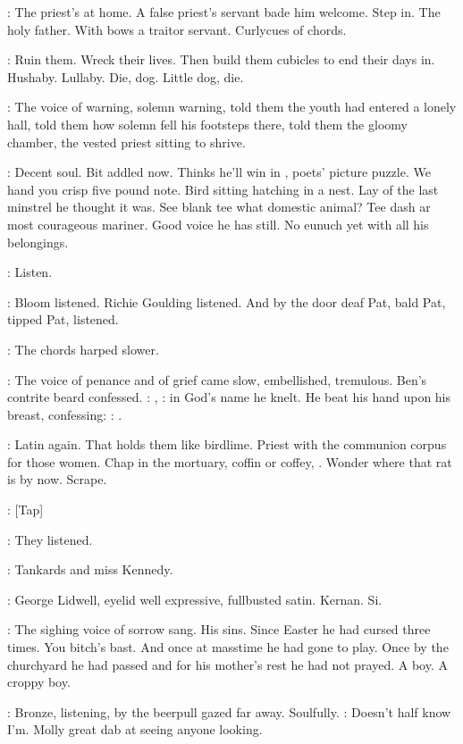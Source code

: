 :
The priest's at home.
A false priest's servant bade him welcome.
Step
in.
The holy father.
With bows a traitor servant.
Curlycues of chords.

\BloomInt:
Ruin them.
Wreck their lives.
Then build them cubicles to end their
days in.
Hushaby.
Lullaby.
Die,
dog.
Little dog,
die.

:
The voice of warning,
solemn warning,
told them the youth had
entered a lonely hall,
told them how solemn fell his footsteps there,
told
them the gloomy chamber,
the vested priest sitting to shrive.

\BloomInt:
Decent soul.
Bit addled now.
Thinks he'll win in
,
poets' picture puzzle.
We hand you crisp five pound note.
Bird sitting hatching
in a nest.
Lay of the last minstrel he thought it was.
See blank tee what
domestic animal?
Tee dash ar most courageous mariner.
Good voice he has
still.
No eunuch yet with all his belongings.

\BloomInt:
Listen.

:
Bloom listened.
Richie Goulding listened.
And by the door
deaf Pat,
bald Pat,
tipped Pat,
listened.

:
The chords harped slower.

:
The voice of penance and of grief came slow,
embellished,
tremulous.
Ben's contrite beard confessed.
\dollard:
,
:
in God's name he knelt.
He beat his hand upon his breast,
confessing:
\dollard:
.

\BloomInt:
Latin again.
That holds them like birdlime.
Priest with the
communion corpus for those women.
Chap in the mortuary,
coffin or
coffey,
.
Wonder where that rat is by now.
Scrape.

\stripling:
[Tap]

:
They listened.

:
Tankards and miss Kennedy.

:
George Lidwell,
eyelid
well expressive,
fullbusted satin.
Kernan.
Si.

:
The sighing voice of sorrow sang.
His sins.
Since Easter he had
cursed three times.
You bitch's bast.
And once at masstime he had gone to
play.
Once by the churchyard he had passed and for his mother's rest he
had not prayed.
A boy.
A croppy boy.

:
Bronze,
listening,
by the beerpull gazed far away.
Soulfully.
\BloomInt:
Doesn't half know I'm.
Molly great dab at seeing anyone looking.

